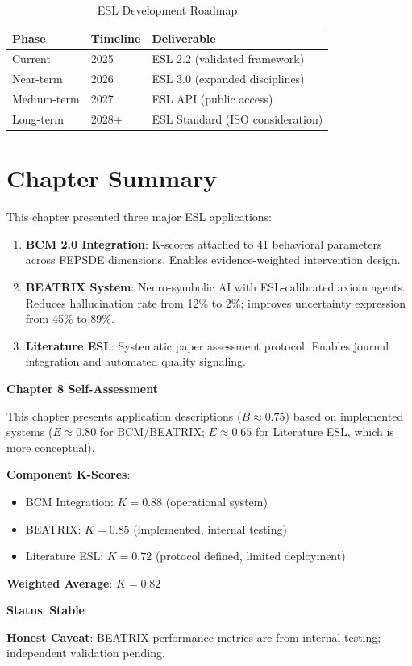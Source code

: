 \documentclass[11pt,a4paper]{article}
\theoremstyle{remark}
\begin{document}
\begin{table}[h]
\centering
\caption{ESL Development Roadmap}
\label{tab:roadmap}
\begin{tabular}{lll}
\toprule
\textbf{Phase} & \textbf{Timeline} & \textbf{Deliverable} \\
\midrule
Current & 2025 & ESL 2.2 (validated framework) \\
Near-term & 2026 & ESL 3.0 (expanded disciplines) \\
Medium-term & 2027 & ESL API (public access) \\
Long-term & 2028+ & ESL Standard (ISO consideration) \\
\bottomrule
\end{tabular}
\end{table}

\section{Chapter Summary}
\label{sec:summary}

This chapter presented three major ESL applications:

\begin{enumerate}
    \item \textbf{BCM 2.0 Integration}: K-scores attached to 41 behavioral parameters across FEPSDE dimensions. Enables evidence-weighted intervention design.

    \item \textbf{BEATRIX System}: Neuro-symbolic AI with ESL-calibrated axiom agents. Reduces hallucination rate from 12\% to 2\%; improves uncertainty expression from 45\% to 89\%.

    \item \textbf{Literature ESL}: Systematic paper assessment protocol. Enables journal integration and automated quality signaling.
\end{enumerate}

\begin{eslbox}
\textbf{Chapter 8 Self-Assessment}

This chapter presents application descriptions ($B \approx 0.75$) based on implemented systems ($E \approx 0.80$ for BCM/BEATRIX; $E \approx 0.65$ for Literature ESL, which is more conceptual).

\textbf{Component K-Scores}:
\begin{itemize}
    \item BCM Integration: $K = 0.88$ (operational system)
    \item BEATRIX: $K = 0.85$ (implemented, internal testing)
    \item Literature ESL: $K = 0.72$ (protocol defined, limited deployment)
\end{itemize}

\textbf{Weighted Average}: $K = 0.82$

\textbf{Status}: \textcolor{eslgreen}{\textbf{Stable}}

\textbf{Honest Caveat}: BEATRIX performance metrics are from internal testing; independent validation pending.
\end{eslbox}
\end{document}
